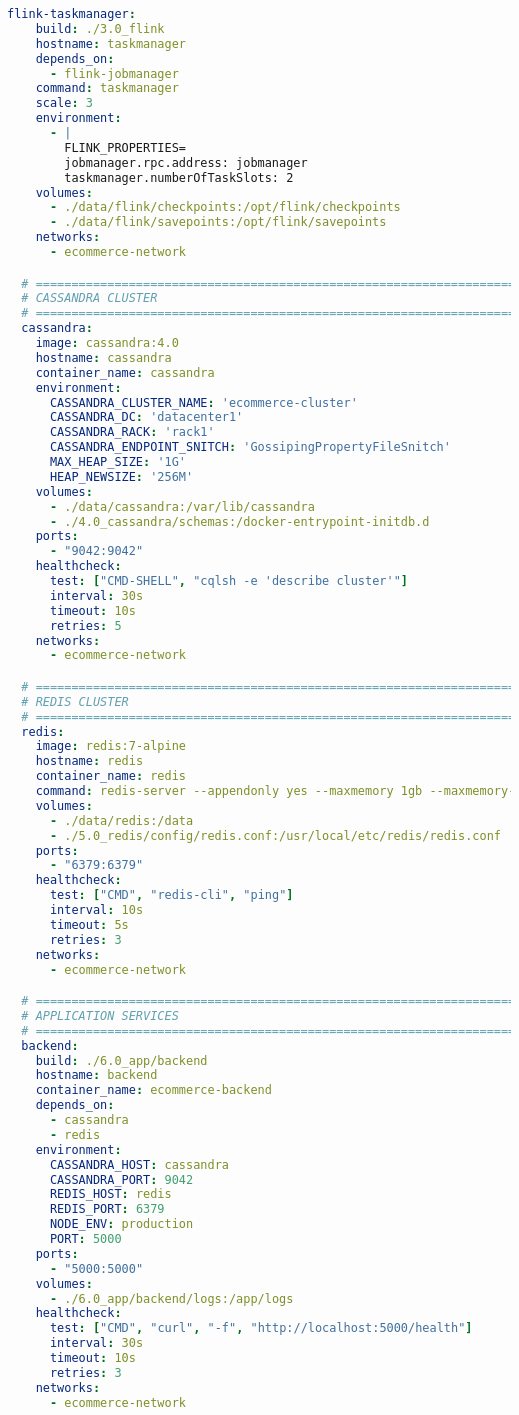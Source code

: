 \begin{lstlisting}[language=yaml, caption=Configuración Docker Compose para Deployment, label=lst:docker_compose]
  flink-taskmanager:
    build: ./3.0_flink
    hostname: taskmanager
    depends_on:
      - flink-jobmanager
    command: taskmanager
    scale: 3
    environment:
      - |
        FLINK_PROPERTIES=
        jobmanager.rpc.address: jobmanager
        taskmanager.numberOfTaskSlots: 2
    volumes:
      - ./data/flink/checkpoints:/opt/flink/checkpoints
      - ./data/flink/savepoints:/opt/flink/savepoints
    networks:
      - ecommerce-network

  # ===================================================================
  # CASSANDRA CLUSTER
  # ===================================================================
  cassandra:
    image: cassandra:4.0
    hostname: cassandra
    container_name: cassandra
    environment:
      CASSANDRA_CLUSTER_NAME: 'ecommerce-cluster'
      CASSANDRA_DC: 'datacenter1'
      CASSANDRA_RACK: 'rack1'
      CASSANDRA_ENDPOINT_SNITCH: 'GossipingPropertyFileSnitch'
      MAX_HEAP_SIZE: '1G'
      HEAP_NEWSIZE: '256M'
    volumes:
      - ./data/cassandra:/var/lib/cassandra
      - ./4.0_cassandra/schemas:/docker-entrypoint-initdb.d
    ports:
      - "9042:9042"
    healthcheck:
      test: ["CMD-SHELL", "cqlsh -e 'describe cluster'"]
      interval: 30s
      timeout: 10s
      retries: 5
    networks:
      - ecommerce-network

  # ===================================================================
  # REDIS CLUSTER
  # ===================================================================
  redis:
    image: redis:7-alpine
    hostname: redis
    container_name: redis
    command: redis-server --appendonly yes --maxmemory 1gb --maxmemory-policy allkeys-lru
    volumes:
      - ./data/redis:/data
      - ./5.0_redis/config/redis.conf:/usr/local/etc/redis/redis.conf
    ports:
      - "6379:6379"
    healthcheck:
      test: ["CMD", "redis-cli", "ping"]
      interval: 10s
      timeout: 5s
      retries: 3
    networks:
      - ecommerce-network

  # ===================================================================
  # APPLICATION SERVICES
  # ===================================================================
  backend:
    build: ./6.0_app/backend
    hostname: backend
    container_name: ecommerce-backend
    depends_on:
      - cassandra
      - redis
    environment:
      CASSANDRA_HOST: cassandra
      CASSANDRA_PORT: 9042
      REDIS_HOST: redis
      REDIS_PORT: 6379
      NODE_ENV: production
      PORT: 5000
    ports:
      - "5000:5000"
    volumes:
      - ./6.0_app/backend/logs:/app/logs
    healthcheck:
      test: ["CMD", "curl", "-f", "http://localhost:5000/health"]
      interval: 30s
      timeout: 10s
      retries: 3
    networks:
      - ecommerce-network


\end{lstlisting}
